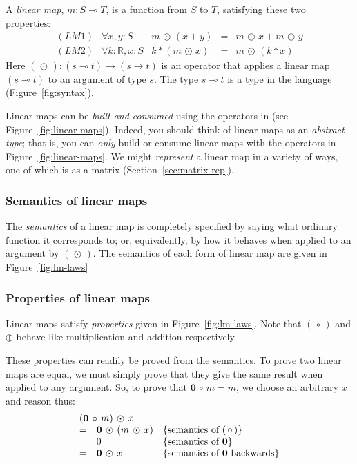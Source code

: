 \documentclass[sigplan,review]{acmart}
\renewcommand{\to}{\rightarrow}    %
\newcommand{\linto}{\multimap}     %
\newcommand{\tcolon}{\!:\!}
\newcommand{\typ}[2]{#1 \tcolon #2}  %
\newcommand{\real}{\mathbb{R}}       %
\newcommand{\lmcomp}{\,\circ\,}   %
\newcommand{\lmapply}{\,\odot\,}      %
\newcommand{\lmadd}{\oplus}        %
\newcommand{\lmzero}{\mathbf{0}}     %
\begin{document}
A \emph{linear map}, $m \tcolon S \linto T$, is a function from $S$ to $T$,
satisfying these two properties:
$$
\begin{array}{lrrcl}
(LM1) & \forall \typ{x,y}{S} &  m \lmapply (x+y) & = & m \lmapply x + m \lmapply y \\
(LM2) & \forall \typ{k}{\real}, \typ{x}{S} & k * (m \lmapply x) & = & m \lmapply (k * x)
\end{array}
$$
Here $(\lmapply) : (s \linto t) \to (s \to t)$ is an operator that applies a linear map $(s \linto t)$
to an argument of type $s$.
The type $s \linto t$ is a type in the language (Figure~\ref{fig:syntax}).

Linear maps can be \emph{built and consumed} using the
operators in (see Figure~\ref{fig:linear-maps}).
Indeed, you should think of linear maps as an \emph{abstract type}; that is,
you can \emph{only} build or consume linear maps with
the operators in Figure~\ref{fig:linear-maps}.  We might \emph{represent} a linear map in a variety
of ways, one of which is as a matrix (Section~\ref{sec:matrix-rep}).

\subsubsection{Semantics of linear maps}

The \emph{semantics} of a linear map is completely specified by saying
what ordinary function it corresponds to; or, equivalently, by how it
behaves when applied to an argument by $(\lmapply)$.  The semantics of
each form of linear map are given in Figure~\ref{fig:lm-laws}

\subsubsection{Properties of linear maps}

Linear maps satisfy \emph{properties} given in Figure~\ref{fig:lm-laws}.
Note that $(\lmcomp)$ and $\lmadd$ behave like multiplication and
addition respectively.

These properties can readily be proved from the semantics.  To prove two linear maps are equal,
we must simply prove that they give the same result when applied to any argument.
So, to prove that $\lmzero \lmcomp m = m$, we choose an arbitrary $x$ and reason thus:
$$\begin{array}{cll}
  \multicolumn{3}{l}{(\lmzero \lmcomp m) \lmapply x} \\
  = & \lmzero \lmapply (m \lmapply x) &  \mbox{\{semantics of $(\lmcomp$)\}} \\
  = & 0                  & \mbox{\{semantics of $\lmzero$\}} \\
  = & \lmzero \lmapply x & \mbox{\{semantics of $\lmzero$ backwards\}}
\end{array}
$$
\end{document}
